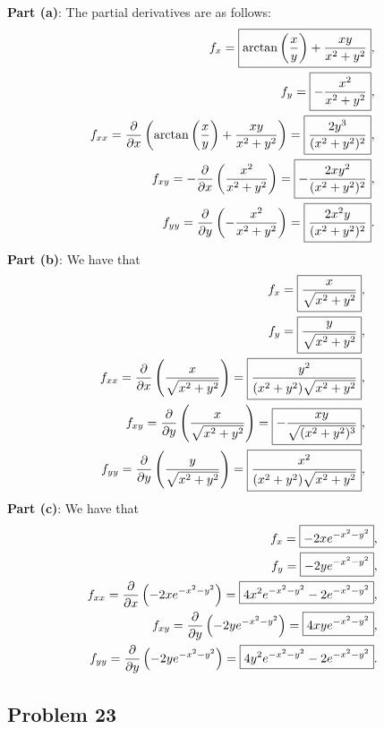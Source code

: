 \documentclass[11pt]{article}
\begin{document}
\textbf{Part (a)}: The partial derivatives are as follows:
\begin{align*}
	f_{x} = \boxed{\arctan \left( \frac{x}{y} \right) + \frac{xy}{x^{2} + y^{2}}}, \\
	f_{y} = \boxed{-\frac{x^{2}}{x^{2} + y^{2}}}, \\
	f_{xx} = \pdv{x} \left( \arctan \left( \frac{x}{y} \right) + \frac{xy}{x^{2} + y^{2}} \right) = \boxed{\frac{2y^{3}}{(x^{2} + y^{2})^{2}}}, \\
	f_{xy} = - \pdv{x} \left( \frac{x^{2}}{x^{2} + y^{2}} \right) = \boxed{ - \frac{2xy^{2}}{(x^{2} + y^{2})^{2}}}, \\
	f_{yy} = \pdv{y} \left( -\frac{x^{2}}{x^{2} + y^{2}} \right) = \boxed{\frac{2x^{2}y}{(x^{2} + y^{2})^{2}}}.
\end{align*}
\textbf{Part (b)}: We have that
\begin{align*}
	f_{x} = \boxed{\frac{x}{\sqrt{x^{2} + y^{2}}}}, \\
	f_{y} = \boxed{\frac{y}{\sqrt{x^{2} + y^{2}}}}, \\
	f_{xx} = \pdv{x} \left( \frac{x}{\sqrt{x^{2} + y^{2}}} \right) = \boxed{\frac{y^{2}}{(x^{2} + y^{2})\sqrt{x^{2} + y^{2}}}}, \\
	f_{xy} = \pdv{y} \left( \frac{x}{\sqrt{x^{2} + y^{2}}} \right) = \boxed{- \frac{xy}{\sqrt{(x^{2} + y^{2})^{3}}}}, \\
	f_{yy} = \pdv{y} \left( \frac{y}{\sqrt{x^{2} + y^{2}}} \right) = \boxed{\frac{x^{2}}{(x^{2} + y^{2})\sqrt{x^{2} + y^{2}}}},
\end{align*}
\textbf{Part (c)}: We have that
\begin{align*}
	f_{x} = \boxed{-2x e^{-x^{2} - y^{2}}}, \\
	f_{y} = \boxed{-2y e^{-x^{2} - y^{2}}}, \\
	f_{xx} = \pdv{x} \left( -2x e^{-x^{2} - y^{2}} \right) = \boxed{4 x^{2} e^{-x^{2} - y^{2}} - 2 e^{-x^{2} - y^{2}}}, \\
	f_{xy} = \pdv{y} \left( -2y e^{-x^{2} - y^{2}} \right) = \boxed{4xy e^{-x^{2} - y^{2}}}, \\
	f_{yy} = \pdv{y} \left( -2y e^{-x^{2} - y^{2}} \right) = \boxed{4 y^{2} e^{-x^{2} - y^{2}} - 2 e^{-x^{2} - y^{2}}}.
\end{align*}


\subsection{Problem 23}
\end{document}
